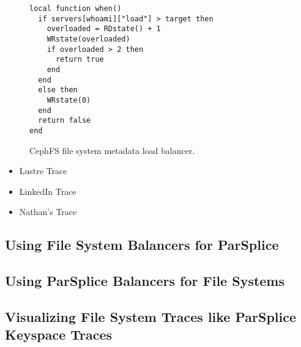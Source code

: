 \begin{figure}[tb]
\footnotesize
\begin{verbatim}
local function when()
  if servers[whoami]["load"] > target then
    overloaded = RDstate() + 1
    WRstate(overloaded)
    if overloaded > 2 then
      return true
    end
  end
  else then
    WRstate(0)
  end
  return false
end
\end{verbatim}
\caption{CephFS file system metadata load balancer.\label{lua:cephfs}}
\end{figure}

\begin{itemize}
  \item Lustre Trace
  \item LinkedIn Trace
  \item Nathan's Trace
\end{itemize}

\subsection{Using File System Balancers for ParSplice}
\subsection{Using ParSplice Balancers for File Systems}
\subsection{Visualizing File System Traces like ParSplice Keyspace Traces}
